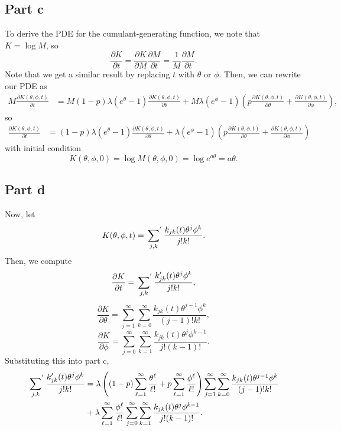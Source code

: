\documentclass{article}
\begin{document}
\subsection{Part c}
To derive the PDE for the cumulant-generating function, we note that $K=\log M$, so 
\[
\frac{\partial K}{\partial t}=\frac{\partial K}{\partial M}\frac{\partial M}{\partial t}=\frac{1}{M}\frac{\partial M}{\partial t}.
\]
Note that we get a similar result by replacing $t$ with $\theta$ or $\phi$. Then, we can rewrite our PDE as
\begin{align*}
	M\frac{\partial K(\theta,\phi,t)}{\partial t}&=
	M(1-p)\lambda(e^\theta-1)\frac{\partial K(\theta,\phi,t)}{\partial \theta}+M\lambda(e^\phi-1)\left(p\frac{\partial K(\theta,\phi,t)}{\partial \theta}+\frac{\partial K(\theta,\phi,t)}{\partial \phi}\right),
\end{align*}
so
\begin{align*}
	\frac{\partial K(\theta,\phi,t)}{\partial t}&=
	(1-p)\lambda(e^\theta-1)\frac{\partial K(\theta,\phi,t)}{\partial \theta}+\lambda(e^\phi-1)\left(p\frac{\partial K(\theta,\phi,t)}{\partial \theta}+\frac{\partial K(\theta,\phi,t)}{\partial \phi}\right)
\end{align*}
with initial condition 
\[
K(\theta, \phi,0)=\log M(\theta, \phi,0)=\log e^{a\theta}=a\theta.
\]

\subsection{Part d}
Now, let
\[
K(\theta,\phi,t)=\sideset{}{^{'}}\sum_{j,k}\frac{k_{jk}(t)\theta^j\phi^k}{j!k!}.
\]
Then, we compute
\[
\frac{\partial K}{\partial t}=\sideset{}{^{'}}\sum_{j,k}\frac{k_{jk}'(t)\theta^j\phi^k}{j!k!},
\]
\[
\frac{\partial K}{\partial \theta}=\sum_{j=1}^\infty\sum_{k=0}^\infty\frac{k_{jk}(t)\theta^{j-1}\phi^k}{(j-1)!k!},
\]
\[
\frac{\partial K}{\partial \phi}=\sum_{j=0}^\infty\sum_{k=1}^\infty\frac{k_{jk}(t)\theta^{j}\phi^{k-1}}{j!(k-1)!}.
\]
Substituting this into part c, 
\begin{align*}
\sideset{}{^{'}}\sum_{j,k}\frac{k_{jk}'(t)\theta^j\phi^k}{j!k!}&=\lambda\left((1-p)\sum_{\ell=1}^{\infty}\frac{\theta^\ell}{\ell!}+p\sum_{\ell=1}^{\infty}\frac{\phi^\ell}{\ell!}\right)\sum_{j=1}^\infty\sum_{k=0}^\infty\frac{k_{jk}(t)\theta^{j-1}\phi^k}{(j-1)!k!}\\&+\lambda\sum_{\ell=1}^{\infty}\frac{\phi^\ell}{\ell!}\sum_{j=0}^\infty\sum_{k=1}^\infty\frac{k_{jk}(t)\theta^{j}\phi^{k-1}}{j!(k-1)!}.
\end{align*}
\end{document}
